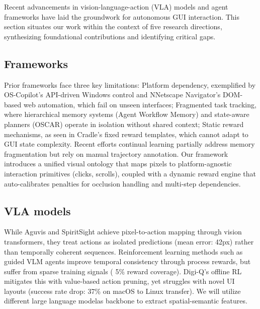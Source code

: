 \documentclass[11pt,letterpaper]{article}
\begin{document}
Recent advancements in vision-language-action (VLA) models and agent frameworks have laid the groundwork for autonomous GUI interaction. This section situates our work within the context of five research directions, synthesizing foundational contributions and identifying critical gaps.

\subsection{Frameworks}
Prior frameworks face three key limitations: Platform dependency, exemplified by OS-Copilot's API-driven Windows control and NNetscape Navigator's DOM-based web automation, which fail on unseen interfaces; Fragmented task tracking, where hierarchical memory systems (Agent Workflow Memory) and state-aware planners (OSCAR) operate in isolation without shared context; Static reward mechanisms, as seen in Cradle's fixed reward templates, which cannot adapt to GUI state complexity. Recent efforts continual learning partially address memory fragmentation but rely on manual trajectory annotation. Our framework introduces a unified visual ontology that maps pixels to platform-agnostic interaction primitives (clicks, scrolls), coupled with a dynamic reward engine that auto-calibrates penalties for occlusion handling and multi-step dependencies.

\subsection{VLA models}
While Aguvis and SpiritSight achieve pixel-to-action mapping through vision transformers, they treat actions as isolated predictions (mean error: 42px) rather than temporally coherent sequences. Reinforcement learning methods such as guided VLM agents improve temporal consistency through process rewards, but suffer from sparse training signals ( 5\% reward coverage). Digi-Q's offline RL mitigates this with value-based action pruning, yet struggles with novel UI layouts (success rate drop: 37\% on macOS to Linux transfer). We will utilize different large language modelas backbone to extract spatial-semantic features.
\end{document}
